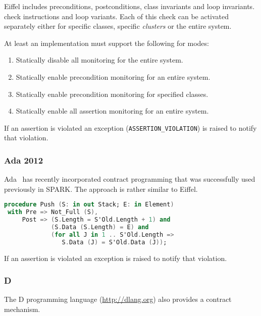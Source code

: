 Eiffel includes preconditions, postconditions, class invariants and loop
invariants. check instructions and loop variants. Each of this check can be
activated separately either for specific classes, specific \emph{clusters} or
the entire system.

At least an implementation must support the following for modes:

\begin{enumerate}

\item Statically disable all monitoring for the entire system.

\item Statically enable precondition monitoring for an entire system.

\item Statically enable precondition monitoring for specified classes.

\item Statically enable all assertion monitoring for an entire system.

\end{enumerate}

If an assertion is violated an exception (\texttt{ASSERTION\_VIOLATION}) is
raised to notify that violation.

\subsubsection{Ada 2012}

Ada~\cite{Ada2012} has recently incorporated contract programming that was
successfully used previously in SPARK. The approach is rather similar to Eiffel.

\begin{lstlisting}[language=Ada]
procedure Push (S: in out Stack; E: in Element)
 with Pre => Not_Full (S),
     Post => (S.Length = S'Old.Length + 1) and
             (S.Data (S.Length) = E) and
             (for all J in 1 .. S'Old.Length => 
                S.Data (J) = S'Old.Data (J)); 
\end{lstlisting}

If an assertion is violated an exception is raised to notify that violation.

\subsubsection{D}

The D programming language (\url{http://dlang.org}) also provides a contract
mechanism.

